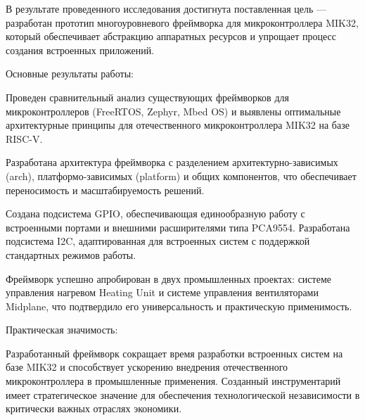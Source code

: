 \Conclusion

В результате проведенного исследования достигнута поставленная цель — разработан прототип многоуровневого фреймворка для микроконтроллера MIK32, который обеспечивает абстракцию аппаратных ресурсов и упрощает процесс создания встроенных приложений.

Основные результаты работы:

Проведен сравнительный анализ существующих фреймворков для микроконтроллеров (FreeRTOS, Zephyr, Mbed OS) и выявлены оптимальные архитектурные принципы для отечественного микроконтроллера MIK32 на базе RISC-V. 

Разработана архитектура фреймворка с разделением архитектурно-зависимых (arch), платформо-зависимых (platform) и общих компонентов, что обеспечивает переносимость и масштабируемость решений.

Создана подсистема GPIO, обеспечивающая единообразную работу с встроенными портами и внешними расширителями типа PCA9554. Разработана подсистема I2C, адаптированная для встроенных систем с поддержкой стандартных режимов работы.

Фреймворк успешно апробирован в двух промышленных проектах: системе управления нагревом Heating Unit и системе управления вентиляторами Midplane, что подтвердило его универсальность и практическую применимость.

Практическая значимость:

Разработанный фреймворк сокращает время разработки встроенных систем на базе MIK32 и способствует ускорению внедрения отечественного микроконтроллера в промышленные применения. Созданный инструментарий имеет стратегическое значение для обеспечения технологической независимости в критически важных отраслях экономики.